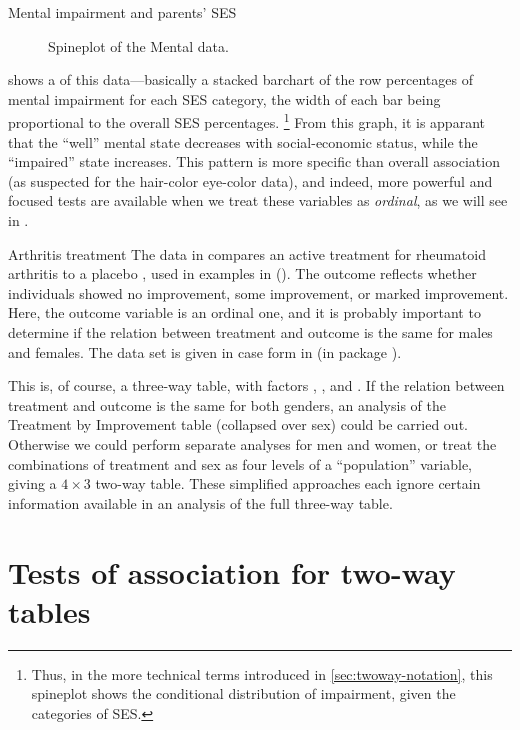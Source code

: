 \documentclass[10pt,krantz2]{krantz}\usepackage[]{graphicx}\usepackage[]{color}
\newenvironment{knitrout}{}{} %
\renewenvironment{knitrout}{\small\renewcommand{\baselinestretch}{.85}}{} %
\begin{document}
\begin{Example}[mental1]{Mental impairment and parents' SES}
\begin{knitrout}
\begin{figure}[!htbp]
\caption[Spineplot of the Mental data]{Spineplot of the Mental data.\label{fig:spineplot}}
\end{figure}


\end{knitrout}
 shows a  of this
data---basically a stacked barchart of the row percentages of mental
impairment for each SES category, the width of each bar being proportional to
the overall SES percentages.
\footnote{Thus, in the more technical terms introduced in \ref{sec:twoway-notation}, 
this spineplot shows the conditional distribution of impairment, given
the categories of SES.}
From this graph, it is apparant that the ``well'' mental state decreases with
social-economic status, while the ``impaired'' state increases. This
pattern is more specific than overall association (as
suspected for the hair-color eye-color data), and indeed, more powerful and focused tests are available
when we treat these variables as \emph{ordinal}, as we will see in
.
\end{Example}

\begin{Example}[arthrit1]{Arthritis treatment}
The data in  compares an active treatment for rheumatoid
arthritis to a placebo
\citep{KochEdwards:88}, used in examples in 
().
The outcome reflects
whether individuals showed no improvement, some improvement, or
marked improvement.
Here, the outcome variable is an ordinal one, and it is probably
important to determine if the relation between treatment and outcome
is the same for males and females.
The data set is given in case form in  (in package ).


This is, of course, a three-way table, with factors
, , and .
If the relation between treatment and outcome is the same for
both genders, an analysis of the Treatment by Improvement
table (collapsed over sex) could be carried out.
Otherwise we could perform separate analyses for
men and women, or
treat the combinations of treatment and sex as four levels of
a ``population'' variable, giving a $4 \times 3$ two-way table.
These simplified approaches each ignore certain information
available in
an analysis of the full three-way table.
\end{Example}

\section{Tests of association for two-way tables}\label{sec:twoway-tests}
\end{document}
